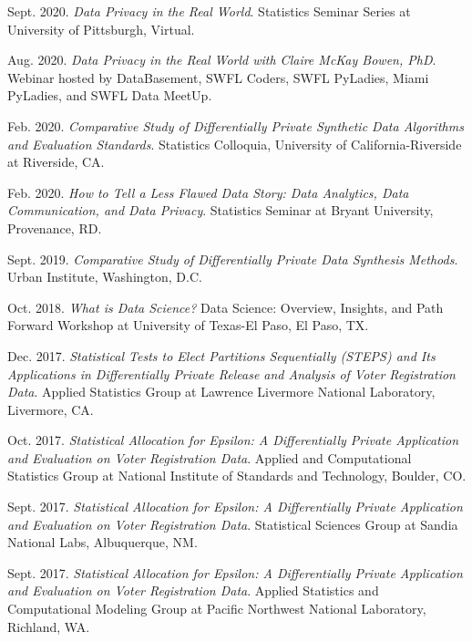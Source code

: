 \begin{etaremune}[topsep=0pt, itemsep=4pt, partopsep=0pt, parsep=0pt]
    \item Sept. 2020. \textit{Data Privacy in the Real World}. Statistics Seminar Series at University of Pittsburgh, Virtual.
        
    \item Aug. 2020. \textit{Data Privacy in the Real World with Claire McKay Bowen, PhD}. Webinar hosted by DataBasement, SWFL Coders, SWFL PyLadies, Miami PyLadies, and SWFL Data MeetUp.
    
    \item Feb. 2020. \textit{Comparative Study of Differentially Private Synthetic Data Algorithms and Evaluation Standards}. Statistics Colloquia, University of California-Riverside at Riverside, CA.
    
    \item Feb. 2020. \textit{How to Tell a Less Flawed Data Story: Data Analytics, Data Communication, and Data Privacy}. Statistics Seminar at Bryant University, Provenance, RD.
    
    \item Sept. 2019. \textit{Comparative Study of Differentially Private Data Synthesis Methods}. Urban Institute, Washington, D.C.
    
    \item Oct. 2018. \textit{What is Data Science?} Data Science: Overview, Insights, and Path Forward Workshop at University of Texas-El Paso, El Paso, TX.
    
    \item Dec. 2017. \textit{Statistical Tests to Elect Partitions Sequentially (STEPS) and Its Applications in Differentially Private Release and Analysis of Voter Registration Data}. Applied Statistics Group at Lawrence Livermore National Laboratory, Livermore, CA.
    
    \item Oct. 2017. \textit{Statistical Allocation for Epsilon: A Differentially Private Application and Evaluation on Voter Registration Data}. Applied and Computational Statistics Group at National Institute of Standards and Technology, Boulder, CO.
    
    \item Sept. 2017. \textit{Statistical Allocation for Epsilon: A Differentially Private Application and Evaluation on Voter Registration Data}. Statistical Sciences Group at Sandia National Labs, Albuquerque, NM.
    
    \item Sept. 2017. \textit{Statistical Allocation for Epsilon: A Differentially Private Application and Evaluation on Voter Registration Data}. Applied Statistics and Computational Modeling Group at Pacific Northwest National Laboratory, Richland, WA.
    

\end{etaremune}
